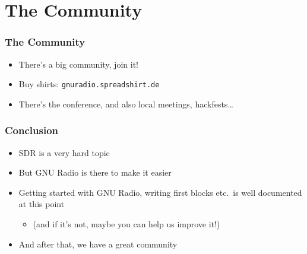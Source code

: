\documentclass{beamer}
\begin{document}
\section{The Community}
\begin{frame}
  \frametitle{The Community}
  \begin{itemize}
    \item There's a big community, join it!
    \item Buy shirts: \texttt{gnuradio.spreadshirt.de}
    \item There's the conference, and also local meetings, hackfests\ldots
  \end{itemize}
\end{frame}

\begin{frame}
  \frametitle{Conclusion}
  \begin{itemize}
    \item SDR is a very hard topic
    \item But GNU Radio is there to make it easier
    \item Getting started with GNU Radio, writing first blocks etc.\ is well documented at this point
      \begin{itemize}
        \item (and if it's not, maybe you can help us improve it!)
      \end{itemize}
    \item And after that, we have a great community
  \end{itemize}
\end{frame}
\end{document}
